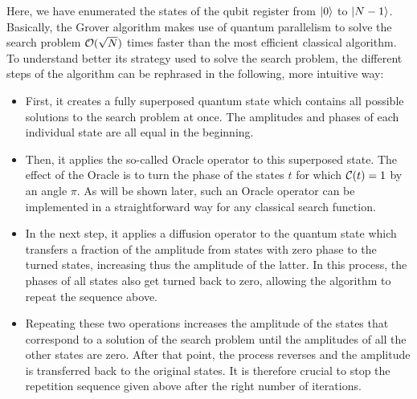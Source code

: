 Here, we have enumerated the states of the qubit register from $\left| 0 \right>$ to $\left| N-1 \right>$. Basically, the Grover algorithm makes use of quantum parallelism to solve the search problem $\begin{mathcal}O\end{mathcal}(\sqrt{N})$ times faster than the most efficient classical algorithm. To understand better its strategy used to solve the search problem, the different steps of the algorithm can be rephrased in the following, more intuitive way:

\begin{itemize}
\item First, it creates a fully superposed quantum state which contains all possible solutions to the search problem at once. The amplitudes and phases of each individual state are all equal in the beginning.
\item Then, it applies the so-called Oracle operator to this superposed state. The effect of the Oracle is to turn the phase of the states $t$ for which $\Or(t)=1$ by an angle $\pi$. As will be shown later, such an Oracle operator can be implemented in a straightforward way for any classical search function.
\item In the next step, it applies a diffusion operator to the quantum state which transfers a fraction of the amplitude from states with zero phase to the turned states, increasing thus the amplitude of the latter. In this process, the phases of all states also get turned back to zero, allowing the algorithm to repeat the sequence above.
\item Repeating these two operations increases the amplitude of the states that correspond to a solution of the search problem until the amplitudes of all the other states are zero. After that point, the process reverses and the amplitude is transferred back to the original states. It is therefore crucial to stop the repetition sequence given above after the right number of iterations.
\end{itemize}

